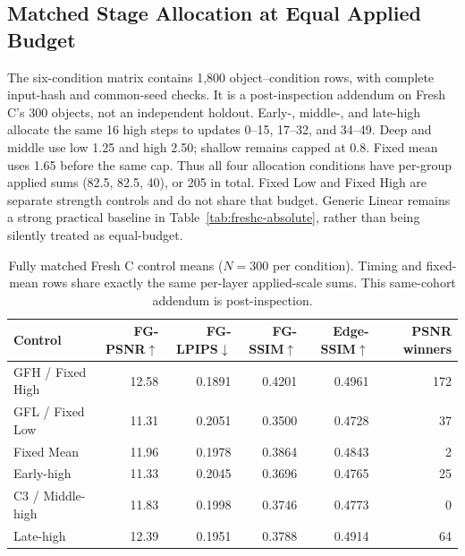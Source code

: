 \documentclass[times,twocolumn,final]{elsarticle}
\providecommand{\DIFadd}[1]{{\protect\color{blue} \sf #1}} %
\providecommand{\DIFaddbegin}{} %
\providecommand{\DIFaddend}{} %
\providecommand{\DIFaddFL}[1]{\DIFadd{#1}} %
\providecommand{\DIFaddbeginFL}{\DIFaddbegin} %
\providecommand{\DIFaddendFL}{\DIFaddend} %
\renewcommand{\DIFaddbeginFL}{}
\renewcommand{\DIFaddendFL}{}
\renewcommand{\DIFaddFL}[1]{#1}
\begin{document}
\subsection{Matched Stage Allocation at Equal Applied Budget}
\label{subsec:matched-budget300}
\DIFaddFL{The six-condition matrix contains 1,800 object--condition rows, with complete input-hash and common-seed checks. It is a post-inspection addendum on Fresh C's 300 objects, not an independent holdout. Early-, middle-, and late-high allocate the same 16 high steps to updates 0--15, 17--32, and 34--49. Deep and middle use low 1.25 and high 2.50; shallow remains capped at 0.8. Fixed mean uses 1.65 before the same cap. Thus all four allocation conditions have per-group applied sums (82.5, 82.5, 40), or 205 in total. Fixed Low and Fixed High are separate strength controls and do not share that budget. Generic Linear remains a strong practical baseline in Table~\ref{tab:freshc-absolute}, rather than being silently treated as equal-budget.
}

\begin{table}[t]
\centering\scriptsize\setlength{\tabcolsep}{4pt}
\caption{Fully matched Fresh C control means ($N=300$ per condition). Timing and fixed-mean rows share exactly the same per-layer applied-scale sums. This same-cohort addendum is post-inspection.}
\label{tab:matched-budget300}
\begin{tabular}{lrrrrr}
\toprule
\DIFaddFL{Control }& \DIFaddFL{FG-PSNR}\DIFaddendFL $\uparrow$ & FG-LPIPS$\downarrow$ \DIFaddbeginFL & \DIFaddFL{FG-SSIM$\uparrow$ }& \DIFaddFL{Edge-SSIM$\uparrow$ }& \DIFaddFL{PSNR winners }\DIFaddendFL \\
\midrule
  \DIFaddbeginFL \DIFaddFL{GFH / Fixed High }\DIFaddendFL &   \DIFaddbeginFL \DIFaddFL{12.58 }\DIFaddendFL &   \DIFaddbeginFL \DIFaddFL{0.1891 }\DIFaddendFL &   \DIFaddbeginFL \DIFaddFL{0.4201 }\DIFaddendFL &   \DIFaddbeginFL \DIFaddFL{0.4961 }& \DIFaddFL{172 }\DIFaddendFL \\
  \DIFaddbeginFL \DIFaddFL{GFL / Fixed Low }\DIFaddendFL &   \DIFaddbeginFL \DIFaddFL{11.31 }\DIFaddendFL &   \DIFaddbeginFL \DIFaddFL{0.2051 }\DIFaddendFL &   \DIFaddbeginFL \DIFaddFL{0.3500 }\DIFaddendFL &   \DIFaddbeginFL \DIFaddFL{0.4728 }& \DIFaddFL{37 }\\
\DIFaddFL{Fixed Mean }& \DIFaddFL{11.96 }& \DIFaddFL{0.1978 }& \DIFaddFL{0.3864 }& \DIFaddFL{0.4843 }& \DIFaddFL{2 }\\
\DIFaddFL{Early-high }& \DIFaddFL{11.33 }& \DIFaddFL{0.2045 }& \DIFaddFL{0.3696 }& \DIFaddFL{0.4765 }& \DIFaddFL{25 }\DIFaddendFL \\
C3   \DIFaddbeginFL \DIFaddFL{/ Middle-high }\DIFaddendFL &   \DIFaddbeginFL \DIFaddFL{11.83 }\DIFaddendFL &   \DIFaddbeginFL \DIFaddFL{0.1998 }\DIFaddendFL &   \DIFaddbeginFL \DIFaddFL{0.3746 }\DIFaddendFL &   \DIFaddbeginFL \DIFaddFL{0.4773 }& \DIFaddFL{0 }\\
\DIFaddFL{Late-high }& \DIFaddFL{12.39 }& \DIFaddFL{0.1951 }& \DIFaddFL{0.3788 }& \DIFaddFL{0.4914 }& \DIFaddFL{64 }\DIFaddendFL \\
\bottomrule
\end{tabular}
  \DIFaddbegin \end{table}
\DIFaddend 
\end{document}
